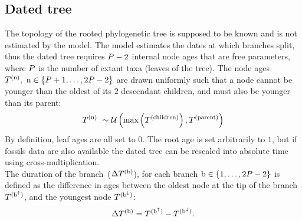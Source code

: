 \documentclass{MBE}
\begin{document}
	\subsection{Dated tree}
	The topology of the rooted phylogenetic tree is supposed to be known and is not estimated by the model.
	The model estimates the dates at which branches split, thus the dated tree requires $P - 2$ internal node ages that are free parameters, where $P$ is the number of extant taxa (leaves of the tree).
	The node ages $T^{(\text{n})},\ \text{n} \in \{P + 1, \hdots, 2 P - 2\}$ are drawn uniformly such that a node cannot be younger than the oldest of its $2$ descendant children, and must also be younger than its parent:
	\begin{equation}
		\label{eq:Distribage}
		\age\nodeexp \ \sim \mathcal{U}\left( \text{max}\left(\age^{(\text{children})} \right), \age^{(\text{parent})} \right)
	\end{equation}
	By definition, leaf ages are all set to $0$. The root age is set arbitrarily to $1$, but if fossils data are also available the dated tree can be rescaled into absolute time using cross-multiplication.\\
	The duration of the branch~($\Delta T^{(\text{b})}$), for each branch $\text{b} \in \{1, \hdots, 2 P - 2\}$ is defined as the difference in ages between the oldest node at the tip of the branch $T^{(\text{b}^{\uparrow})}$, and the youngest node $T^{(\text{b}^{\downarrow})}$:
	\begin{equation}
		\label{eq:ageTobranchtime}
		\branchtime\branchexp = \age^{(\nodeUp)} - \age^{(\nodeDown)}.
	\end{equation}
\end{document}
